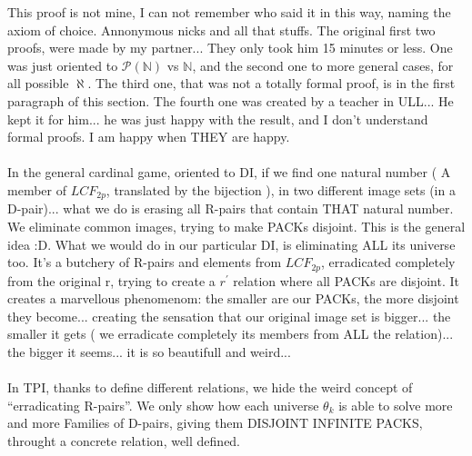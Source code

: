 		\noindent
		This proof is not mine, I can not remember who said it in this way, naming the axiom of choice. Annonymous nicks and all that stuffs. The original first two proofs, were made by my partner... They only took him 15 minutes or less. One was just oriented to $\mathcal{P}(\mathbb{N})$ vs $\mathbb{N}$, and the second one to more general cases, for all possible $\aleph$. The third one, that was not a totally formal proof, is in the first paragraph of this section. The fourth one was created by a teacher in ULL... He kept it for him... he was just happy with the result, and I don't understand formal proofs. I am happy when THEY are happy.
		\\\\
		
		\noindent
		In the general cardinal game, oriented to DI, if we find one natural number ( A member of $LCF_{2p}$, translated by the bijection ), in two different image sets (in a D-pair)... what we do is erasing all R-pairs that contain THAT natural number. We eliminate common images, trying to make PACKs disjoint. This is the general idea :D. What we would do in our particular DI, is eliminating ALL its universe too. It's a butchery of R-pairs and elements from $LCF_{2p}$, erradicated completely from the original r, trying to create a $r^{\prime}$ relation where all PACKs are disjoint. It creates a marvellous phenomenom: the smaller are our PACKs, the more disjoint they become... creating the sensation that our original image set is bigger... the smaller it gets ( we erradicate completely its members from ALL the relation)... the bigger it seems... it is so beautifull and weird...
		\\\\
		
		\noindent
		In TPI, thanks to define different relations, we hide the weird concept of ``erradicating R-pairs''. We only show how each universe $\theta_{k}$ is able to solve more and more Families of D-pairs, giving them DISJOINT INFINITE PACKS, throught a concrete relation, well defined.
		\\\\
		
